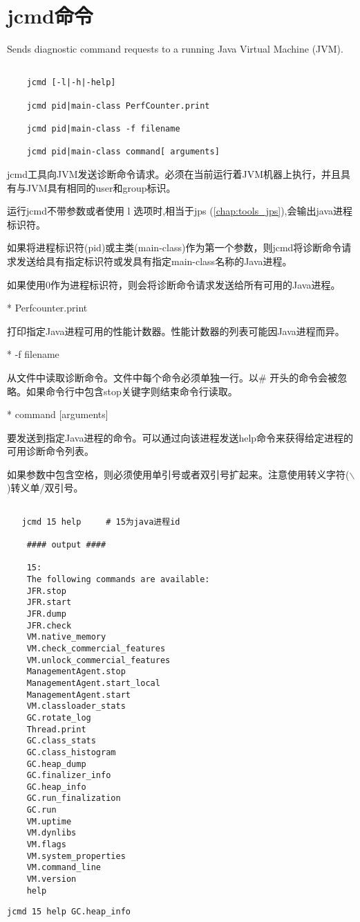 \section{jcmd命令}
\label{chap:tools_jcmd}

Sends diagnostic command requests to a running Java Virtual Machine (JVM).

\begin{lstlisting}[language=cshell]

    jcmd [-l|-h|-help]

    jcmd pid|main-class PerfCounter.print

    jcmd pid|main-class -f filename

    jcmd pid|main-class command[ arguments]

\end{lstlisting}


jcmd工具向JVM发送诊断命令请求。必须在当前运行着JVM机器上执行，并且具有与JVM具有相同的user和group标识。

运行jcmd不带参数或者使用 \-l 选项时,相当于jps (\textcolor[rgb]{0,0,1}{\ref{chap:tools_jps}}),会输出java进程标识符。

如果将进程标识符(pid)或主类(main-class)作为第一个参数，则jcmd将诊断命令请求发送给具有指定标识符或发具有指定main-class名称的Java进程。

如果使用0作为进程标识符，则会将诊断命令请求发送给所有可用的Java进程。


* Perfcounter.print

打印指定Java进程可用的性能计数器。性能计数器的列表可能因Java进程而异。


* -f filename

从文件中读取诊断命令。文件中每个命令必须单独一行。以\# 开头的命令会被忽略。如果命令行中包含\textcolor{codepurple}{stop}关键字则结束命令行读取。

* command [arguments]

要发送到指定Java进程的命令。可以通过向该进程发送\textcolor{codepurple}{help}命令来获得给定进程的可用诊断命令列表。

如果参数中包含空格，则必须使用单引号或者双引号扩起来。注意使用转义字符($\backslash$)转义单/双引号。


\begin{lstlisting}[language=cshell]

   jcmd 15 help     # 15为java进程id

    #### output ####

    15:
    The following commands are available:
    JFR.stop
    JFR.start
    JFR.dump
    JFR.check
    VM.native_memory
    VM.check_commercial_features
    VM.unlock_commercial_features
    ManagementAgent.stop
    ManagementAgent.start_local
    ManagementAgent.start
    VM.classloader_stats
    GC.rotate_log
    Thread.print
    GC.class_stats
    GC.class_histogram
    GC.heap_dump
    GC.finalizer_info
    GC.heap_info
    GC.run_finalization
    GC.run
    VM.uptime
    VM.dynlibs
    VM.flags
    VM.system_properties
    VM.command_line
    VM.version
    help

\end{lstlisting}

\begin{lstlisting}[language=cshell]
    jcmd 15 help GC.heap_info
\end{lstlisting}






